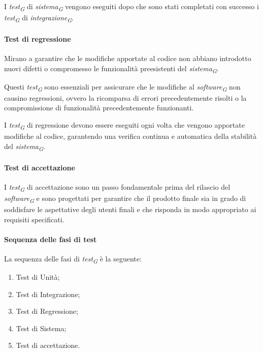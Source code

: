I \textit{test}\textsubscript{\textit{G}} di \textit{sistema}\textsubscript{\textit{G}} vengono eseguiti dopo che sono stati completati con successo i \textit{test}\textsubscript{\textit{G}} di \textit{integrazione}\textsubscript{\textit{G}}. 

\paragraph{Test di regressione}
Mirano a garantire che le modifiche apportate al codice non abbiano introdotto nuovi difetti o compromesso le funzionalità preesistenti del \textit{sistema}\textsubscript{\textit{G}}. 

Questi \textit{test}\textsubscript{\textit{G}} sono essenziali per assicurare che le modifiche al \textit{software}\textsubscript{\textit{G}} non causino regressioni, ovvero la ricomparsa di errori precedentemente risolti o la compromissione di funzionalità precedentemente funzionanti. 

I \textit{test}\textsubscript{\textit{G}} di regressione devono essere eseguiti ogni volta che vengono apportate modifiche al codice, garantendo una verifica continua e automatica della stabilità del \textit{sistema}\textsubscript{\textit{G}}. 

\paragraph{Test di accettazione}
I \textit{test}\textsubscript{\textit{G}} di accettazione sono un passo fondamentale prima del rilascio del \textit{software}\textsubscript{\textit{G}} e sono progettati per garantire che il prodotto finale sia in grado di soddisfare le aspettative degli utenti finali e che risponda in modo appropriato ai requisiti specificati. 

\paragraph{Sequenza delle fasi di test}
La sequenza delle fasi di \textit{test}\textsubscript{\textit{G}} è la seguente:

\begin{enumerate}
    \item Test di Unità;
    \item Test di Integrazione;
    \item Test di Regressione;
    \item Test di Sistema;
    \item Test di accettazione.
\end{enumerate}

